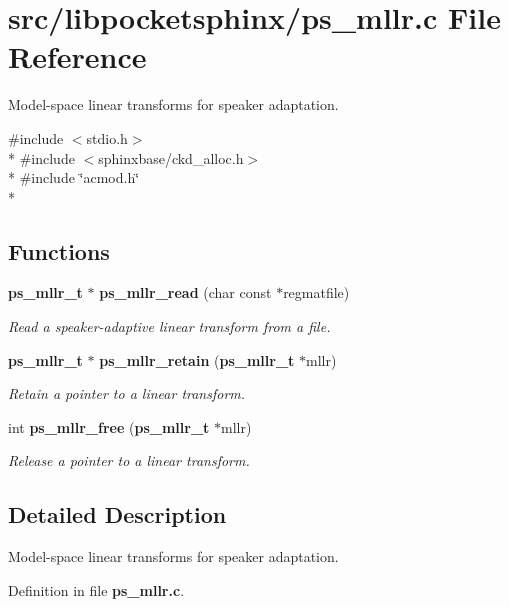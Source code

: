 \section{src/libpocketsphinx/ps\-\_\-mllr.c File Reference}
\label{ps__mllr_8c}


Model-\/space linear transforms for speaker adaptation.  


{\ttfamily \#include $<$stdio.\-h$>$}\\*
{\ttfamily \#include $<$sphinxbase/ckd\-\_\-alloc.\-h$>$}\\*
{\ttfamily \#include \char`\"{}acmod.\-h\char`\"{}}\\*
\subsection*{Functions}
\begin{DoxyCompactItemize}
\item 
{\bf ps\-\_\-mllr\-\_\-t} $\ast$ {\bf ps\-\_\-mllr\-\_\-read} (char const $\ast$regmatfile)\label{ps__mllr_8c_ab62fb9c8cf3bdeed75a7ac2870d56a5a}

\begin{DoxyCompactList}\small\item\em Read a speaker-\/adaptive linear transform from a file. \end{DoxyCompactList}\item 
{\bf ps\-\_\-mllr\-\_\-t} $\ast$ {\bf ps\-\_\-mllr\-\_\-retain} ({\bf ps\-\_\-mllr\-\_\-t} $\ast$mllr)\label{ps__mllr_8c_ae21e7d8a0fa751aaccc5ef39dc5d1fe0}

\begin{DoxyCompactList}\small\item\em Retain a pointer to a linear transform. \end{DoxyCompactList}\item 
int {\bf ps\-\_\-mllr\-\_\-free} ({\bf ps\-\_\-mllr\-\_\-t} $\ast$mllr)\label{ps__mllr_8c_a240194a6ef30b01da38e3654c984b017}

\begin{DoxyCompactList}\small\item\em Release a pointer to a linear transform. \end{DoxyCompactList}\end{DoxyCompactItemize}


\subsection{Detailed Description}
Model-\/space linear transforms for speaker adaptation. 

Definition in file {\bf ps\-\_\-mllr.\-c}.

